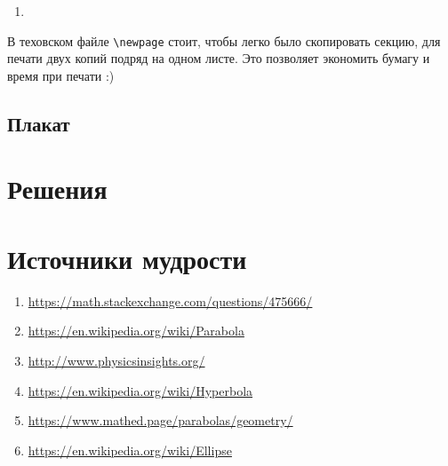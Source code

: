 \documentclass[12pt]{article}
\newcounter{problem}[section]
\theoremstyle{definition}
\begin{document}
\begin{enumerate}
  \item 
\end{enumerate}

В теховском файле \verb|\newpage| стоит, чтобы легко было скопировать секцию, для печати двух копий подряд на одном листе.
Это позволяет экономить бумагу и время при печати :)

\subsection{Плакат}






\renewenvironment{solution}[1]{%
         \vskip .5cm plus 2cm minus 0.1cm%
         {\bfseries \hyperlink{problem:#1}{#1.}}%
}%
{%
}%



\section{Решения}



\section{Источники мудрости}


\begin{enumerate}
\item \url{https://math.stackexchange.com/questions/475666/}
\item \url{https://en.wikipedia.org/wiki/Parabola}
\item \url{http://www.physicsinsights.org/}
\item \url{https://en.wikipedia.org/wiki/Hyperbola}
\item \url{https://www.mathed.page/parabolas/geometry/}
\item \url{https://en.wikipedia.org/wiki/Ellipse}
\end{enumerate}

\printbibliography[heading=none]
\end{document}
